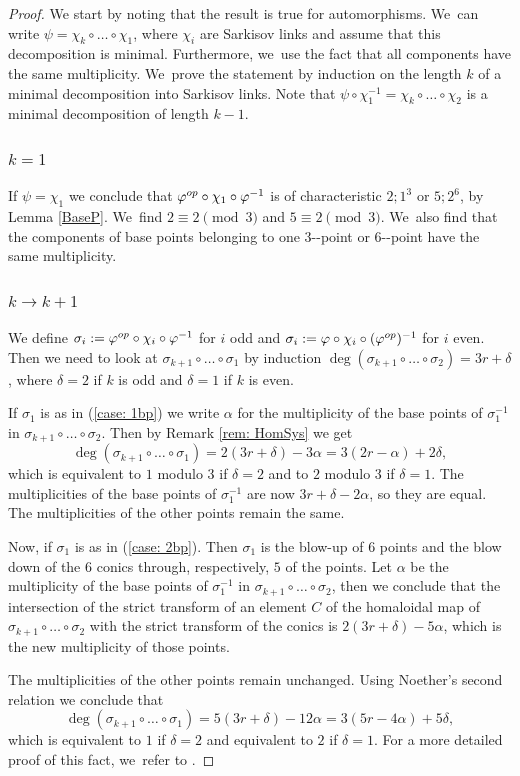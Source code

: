 \documentclass[10pt,a4paper]{amsart}
\providecommand{\nobreakdash}{\nobreak\hbox{-}}
\newcommand{\op}{\textup{op}}
\theoremstyle{definition}
\begin{document}
\begin{proof}
We start by noting that the result is true for automorphisms. We~can write $\psi = \chi_k \circ \dots \circ \chi_1$, where $\chi_i$ are Sarkisov links and assume that this decomposition is minimal. Furthermore, we~use the fact that all components have the same multiplicity. We~prove the statement by induction on the length $k$ of a minimal decomposition into Sarkisov links. Note that $\psi \circ \chi_1^{-1} = \chi_k \circ \dots \circ \chi_2$ is a minimal decomposition of length $k-1$.

\subsubsection*{$k=1$}
If $\psi = \chi_1$ we conclude that $\varphi^{\op} \circ \chi_1 \circ \varphi^{-1}$ is of characteristic $2;1^3$ or $5;2^6$, by Lemma \ref{BaseP}. We~find $2 \equiv 2 \pmod 3$ and $5 \equiv 2 \pmod 3$. We~also find that the components of base points belonging to one $3$\nobreakdash-point or $6$\nobreakdash-point have the same multiplicity.

\subsubsection*{$k \to k+1$}
We define $\sigma_i := \varphi^{\op} \circ \chi_i \circ \varphi^{-1}$ for $i$ odd and $\sigma_i := \varphi \circ\chi_i \circ (\varphi^{\op})^{-1}$ for $i$ even. Then we need to look at $\sigma_{k+1} \circ \dots \circ \sigma_1$ by induction $\deg(\sigma_{k+1} \circ \dots \circ \sigma_2) = 3r + \delta$, where $\delta = 2$ if $k$ is odd and $\delta = 1$ if $k$ is even.

If $\sigma_1$ is as in (\ref{case: 1bp}) we write $\alpha$ for the multiplicity of the base points of $\sigma_1^{-1}$ in $\sigma_{k+1} \circ \dots \circ \sigma_2$. Then by Remark \ref{rem: HomSys} we get
\[
\deg(\sigma_{k+1} \circ \dots \circ \sigma_1) = 2(3r + \delta) - 3\alpha = 3(2r - \alpha) + 2 \delta,
\]
which is equivalent to $1$ modulo $3$ if $\delta = 2$ and to $2$ modulo $3$ if $\delta = 1$. The multiplicities of the base points of $\sigma_1^{-1}$ are now $3r + \delta - 2 \alpha$, so they are equal. The multiplicities of the other points remain the same.

Now, if $\sigma_1$ is as in (\ref{case: 2bp}). Then $\sigma_1$ is the blow-up of $6$ points and the blow down of the $6$ conics through, respectively, $5$ of the points. Let $\alpha$ be the multiplicity of the base points of $\sigma_1^{-1}$ in $\sigma_{k+1} \circ \dots \circ \sigma_2$, then we conclude that the intersection of the strict transform of an element $C$ of the homaloidal map of $\sigma_{k+1} \circ \dots \circ \sigma_2$ with the strict transform of the conics is $2(3r + \delta) - 5\alpha$, which is the new multiplicity of those points.

The multiplicities of the other points remain unchanged. Using Noether's second relation we conclude that
\[
\deg(\sigma_{k+1} \circ \dots \circ \sigma_1) = 5(3r + \delta) - 12 \alpha = 3(5r - 4 \alpha) + 5\delta,
\]
which is equivalent to $1$ if $\delta = 2$ and equivalent to $2$ if $\delta = 1$. For a more detailed proof of this fact, we~refer to \cite[\S 4]{zbMATH01683518}.
\end{proof}
\end{document}
